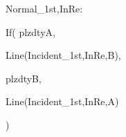 Normal_{1st,InRe}: 
  
  If(
    plzdtyA,
    
    Line(Incident_{1st,InRe},B),

    plzdtyB,
    
    Line(Incident_{1st,InRe},A)
    
  )